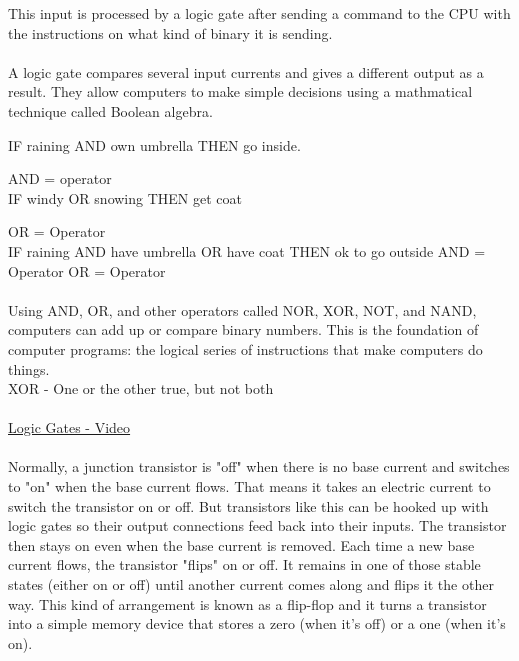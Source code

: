 \documentclass{article}
\begin{document}
This input is processed by a logic gate after sending a command to the CPU with the instructions on what kind of binary it is sending.
\\
\\
A logic gate compares several input currents and gives a different output as a result. They allow computers to make simple decisions using a mathmatical technique called Boolean algebra. 

IF raining AND own umbrella THEN go inside.

AND = operator
\\
IF windy OR snowing THEN get coat

OR = Operator
\\
IF raining AND have umbrella OR have coat THEN ok to go outside
AND = Operator
OR = Operator
\\
\\
Using AND, OR, and other operators called NOR, XOR, NOT, and NAND, computers can add up or compare binary numbers. This is  the foundation of computer programs: the logical series of instructions that make computers do things.
\\
XOR - One or the other true, but not both
\\
\\
\href{https://en.wikipedia.org/wiki/Logic_gate}{Logic Gates - Video}
\\
\\
Normally, a junction transistor is "off" when there is no base current and switches to "on" when the base current flows. That means it takes an electric current to switch the transistor on or off. But transistors like this can be hooked up with logic gates so their output connections feed back into their inputs. The transistor then stays on even when the base current is removed. Each time a new base current flows, the transistor "flips" on or off. It remains in one of those stable states (either on or off) until another current comes along and flips it the other way. This kind of arrangement is known as a flip-flop and it turns a transistor into a simple memory device that stores a zero (when it's off) or a one (when it's on). 
\end{document}

